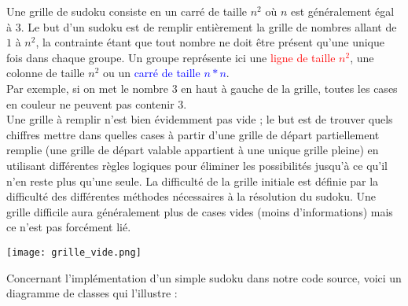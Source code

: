 \documentclass[a4paper]{article}
\begin{document}
\begin{minipage}[t]{0.6\textwidth}
\begin{justify}
    \qquad Une grille de sudoku consiste en un carré de taille $n^2$ où $n$ est généralement égal à $3$. Le but d'un sudoku est de remplir entièrement la grille de nombres allant de $1$ à $n^2$, la contrainte étant que tout nombre ne doit être présent qu'une unique fois dans chaque groupe. Un groupe représente ici une \textcolor{red}{ligne de taille $n^2$}, une \textcolor{vertLisible}{colonne de taille $n^2$} ou un \textcolor{blue}{carré de taille $n*n$}. \\
     
    Par exemple, si on met le nombre $3$ en \textcolor{jauneLisible}{haut à gauche} de la grille, toutes les cases en couleur ne peuvent pas contenir $3$.\\

    Une grille à remplir n'est bien évidemment pas vide ; le but est de trouver quels chiffres mettre dans quelles cases à partir d'une grille de départ partiellement remplie (une grille de départ valable appartient à une unique grille pleine) en utilisant différentes règles logiques pour éliminer les possibilités jusqu'à ce qu'il n'en reste plus qu'une seule. La difficulté de la grille initiale est définie par la difficulté des différentes méthodes nécessaires à la résolution du sudoku. Une grille difficile aura généralement plus de cases vides (moins d'informations) mais ce n'est pas forcément lié. \\
\end{justify}
\end{minipage}
\hfill
\begin{minipage}[t]{0.4\textwidth}
    \vspace{0pt}
     \centering
     \texttt{[image: grille\_vide.png]}
\end{minipage}
    \hfill
     Concernant l'implémentation d'un simple sudoku dans notre code source, voici un diagramme de classes qui l'illustre :
     \mbox{}\\[0.5em]
\end{document}
